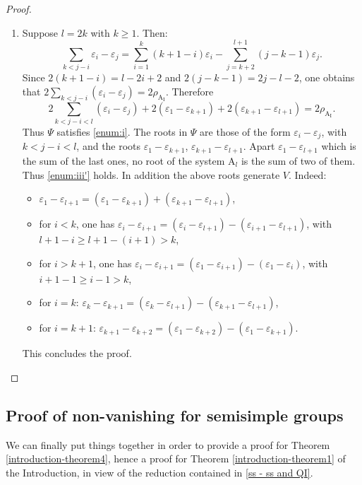 \documentclass[JEP,XML,SOM,Unicode,published]{cedram}
\newcommand{\rI}{\mathrm{I}}
\theoremstyle{plain}
\theoremstyle{remark}
\theoremstyle{definition}
\begin{document}
\begin{proof}
\begin{enumerate}
\item
Suppose $l = 2k$ with $k \geqslant 1$. Then:\vspace*{-3pt}
\[\sum_{k<j-i} \varepsilon_i - \varepsilon_j =
\sum_{i =1}^{k} (k+1-i)\varepsilon_i
- \sum_{j = k+2}^{l+1} (j-k-1) \varepsilon_j.\]
Since $2(k +1 - i)= l-2i+2$ and $2(j-k-1)= 2j-l-2$, one obtains that
$2 \sum_{k<j-i} (\varepsilon_i - \varepsilon_j) = 2\rho_{\mathrm{A}_\rI}$.
Therefore\vspace*{-3pt}
\[2\sum_{k<j-i<l} (\varepsilon_i - \varepsilon_j)
+ 2(\varepsilon_1 - \varepsilon_{k+1}) +
2(\varepsilon_{k+1} - \varepsilon_{l+1}) = 2\rho_{\mathrm{A}_\rI}.\]
Thus $\Psi$ satisfies \eqref{enum:i}.
The roots in $\Psi$ are those of the form $\varepsilon_i - \varepsilon_j$, with $k< j-i <l$, and the roots
$\varepsilon_1 - \varepsilon_{k+1}$, $\varepsilon_{k+1} - \varepsilon_{l+1}$. Apart $\varepsilon_1 - \varepsilon_{l+1}$
which is the sum of the last ones, no root of the system $\mathrm A_l$ is the sum of two of them. Thus \eqref{enum:iii'} holds.
In addition the above roots generate $V$. Indeed:
\begin{itemize}
\item $\varepsilon_1 - \varepsilon_{l+1} = (\varepsilon_1 - \varepsilon_{k+1}) + (\varepsilon_{k+1} - \varepsilon_{l+1})$,
\item for $i < k$, one has $\varepsilon_i - \varepsilon_{i+1} = (\varepsilon_i - \varepsilon_{l+1}) -
(\varepsilon_{i+1} - \varepsilon_{l+1})$, with $l+1 -i \geqslant l+1 - (i+1) > k$,
\item for $i > k+1$, one has
$\varepsilon_i - \varepsilon_{i+1} = (\varepsilon_1 - \varepsilon_{i+1}) - (\varepsilon_1 - \varepsilon_i)$,
with $i+1 - 1 \geqslant i- 1 > k$,
\item for $i =k$: $\varepsilon_k - \varepsilon_{k+1} = (\varepsilon_k - \varepsilon_{l+1}) -
(\varepsilon_{k+1} - \varepsilon_{l+1})$,
\item for $i = k+1$: $\varepsilon_{k+1} - \varepsilon_{k+2} = (\varepsilon_1 - \varepsilon_{k+2}) -
(\varepsilon_1 - \varepsilon_{k+1})$.
\end{itemize}
This concludes the proof.\qedhere
\end{enumerate}
\end{proof}

\subsection{Proof of non-vanishing for semisimple groups}
We can finally put things together in order to provide a proof for Theorem \ref{introduction-theorem4}, hence a proof for Theorem \ref{introduction-theorem1} of the Introduction, in view of the reduction contained in \ref{ss - ss and QI}.
\end{document}

